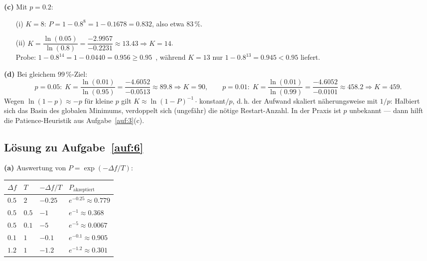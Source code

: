 \documentclass[a4paper,11pt]{scrartcl}
\begin{document}
\textbf{(c)} Mit $p = 0.2$:
\begin{itemize}[itemsep=1pt]
  \item[(i)] $K = 8$: $P = 1 - 0.8^{8} = 1 - 0.1678 = 0.832$, also etwa $83\,\%$.
  \item[(ii)] $K = \dfrac{\ln(0.05)}{\ln(0.8)} = \dfrac{-2.9957}{-0.2231} \approx 13.43
        \Rightarrow K = 14$.\\
        Probe: $1 - 0.8^{14} = 1 - 0.0440 = 0.956 \geq 0.95$~\checkmark, während
        $K = 13$ nur $1 - 0.8^{13} = 0.945 < 0.95$ liefert.
\end{itemize}

\textbf{(d)} Bei gleichem $99\,\%$-Ziel:
\[
  p = 0.05:\; K = \frac{\ln(0.01)}{\ln(0.95)} = \frac{-4.6052}{-0.0513} \approx 89.8
  \Rightarrow K = 90,
  \qquad
  p = 0.01:\; K = \frac{\ln(0.01)}{\ln(0.99)} = \frac{-4.6052}{-0.0101} \approx 458.2
  \Rightarrow K = 459.
\]
Wegen $\ln(1-p) \approx -p$ für kleine $p$ gilt $K \approx \ln(1-P)^{-1}\cdot$\,konstant$/p$,
d.\,h. der Aufwand skaliert näherungsweise mit $1/p$: Halbiert sich das Basin des globalen
Minimums, verdoppelt sich (ungefähr) die nötige Restart-Anzahl. In der Praxis ist $p$
unbekannt --- dann hilft die Patience-Heuristik aus Aufgabe~\ref{auf:3}(c).

\subsection*{Lösung zu Aufgabe~\ref{auf:6}}

\textbf{(a)} Auswertung von $P = \exp(-\Delta f / T)$:

\begin{center}
\begin{tabular}{@{}llll@{}}
\toprule
$\Delta f$ & $T$ & $-\Delta f / T$ & $P_{\text{akzeptiert}}$\\
\midrule
$0.5$ & $2$   & $-0.25$ & $e^{-0.25} \approx 0.779$\\
$0.5$ & $0.5$ & $-1$    & $e^{-1} \approx 0.368$\\
$0.5$ & $0.1$ & $-5$    & $e^{-5} \approx 0.0067$\\
\midrule
$0.1$ & $1$   & $-0.1$  & $e^{-0.1} \approx 0.905$\\
$1.2$ & $1$   & $-1.2$  & $e^{-1.2} \approx 0.301$\\
\bottomrule
\end{tabular}
\end{center}
\end{document}
